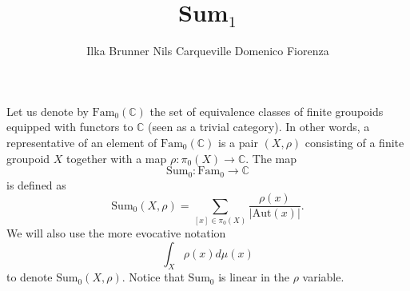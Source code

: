 \documentclass[12pt]{scrartcl}
\theoremstyle{definition}
\numberwithin{equation}{section}
\numberwithin{definition}{section}
\numberwithin{figure}{section}
\begin{document}
\title{Sum${}_1$}

\author{%
\!\!\!\!\!\!\!Ilka Brunner \quad
Nils Carqueville \quad
Domenico Fiorenza \quad
}

\date{}
\maketitle



\tableofcontents



\section{}

Let us denote by $\mathrm{Fam}_0(\mathbb{C})$ the set of equivalence classes of finite groupoids equipped with functors to $\mathbb{C}$ (seen as a trivial category). In other words, a representative of an element of $\mathrm{Fam}_0(\mathbb{C})$ is a pair $(X,\rho)$ consisting of a finite groupoid $X$ together with a map $\rho\colon \pi_0(X)\to \mathbb{C}$.
The map 
\[
\mathrm{Sum}_0\colon \mathrm{Fam}_0\to \mathbb{C}
\]
is defined as
\[
\mathrm{Sum}_0(X,\rho)=\sum_{[x]\in \pi_0(X)}\frac{\rho(x)}{|\mathrm{Aut}(x)|}.
\]
We will also use the more evocative notation
\[
\int_X \rho(x) d\mu(x)
\]
to denote $\mathrm{Sum}_0(X,\rho)$. Notice that $\mathrm{Sum}_0$ is linear in the $\rho$ variable.
\end{document}
